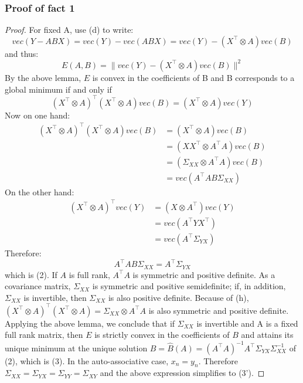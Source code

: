 \subsubsection{Proof of fact 1}
\begin{proof}
    For fixed A, use (d) to write:
    \[
        vec(Y - ABX) = vec(Y) - vec(ABX) = vec(Y) - (X^\intercal \otimes A) vec(B)
    \]
    and thus:
    \[
    E(A,B) = \|vec(Y) - (X^\intercal \otimes A) vec(B)\|^2
    \]
    By the above lemma, $E$ is convex in the coefficients of B and B corresponds to a global minimum if and only if \[
    (X^\intercal \otimes A)^\intercal (X^\intercal \otimes A) vec(B) = (X^\intercal \otimes A) vec(Y)
    \]
    Now on one hand:
    \[
    \begin{split}
         (X^\intercal \otimes A)^\intercal (X^\intercal \otimes A) vec(B) &= (X^\intercal \otimes A) vec(B)\\ &= (XX^\intercal \otimes A^\intercal A) vec(B)\\ &= (\Sigma_{XX} \otimes A^\intercal A)vec(B) \\ &= vec(A^\intercal A B\Sigma_{XX})
    \end{split}
    \]
    On the other hand:
    \[
        \begin{split}
            (X^\intercal \otimes A)^\intercal vec(Y) &= (X \otimes A^\intercal)vec(Y) \\
            &= vec(A^\intercal YX^\intercal)\\
            &= vec(A^\intercal \Sigma_{YX})
        \end{split}
    \]
    Therefore:
    \[
        A^\intercal AB\Sigma_{XX} = A^\intercal \Sigma_{YX}
    \]
    which is (2). If $A$ is full rank, $A^\intercal A$ is symmetric and positive definite. As a covariance matrix, $\Sigma_{XX}$ is symmetric and positive semidefinite; if, in addition, $\Sigma_{XX}$ is invertible, then $\Sigma_{XX}$ is also positive definite. Because of (h), $(X^\intercal  \otimes A)^\intercal (X^\intercal \otimes A) = \Sigma_{XX} \otimes A^\intercal A$ is also symmetric and positive definite. Applying the above lemma, we conclude that if $\Sigma_{XX}$ is invertible and A is a fixed full rank matrix, then $E$ is strictly convex in the coefficients of $B$ and attains its unique minimum at the unique solution $B = \hat{B}(A) = (A^\intercal A)^{-1}A^\intercal \Sigma_{YX} \Sigma_{XX}^{-1}$ of (2), which is (3). In the auto-associative case, $x_n = y_n$. Therefore $\Sigma_{XX} = \Sigma_{YX} = \Sigma_{YY} = \Sigma_{XY}$ and the above expression simplifies to (3').
    \end{proof}
    
